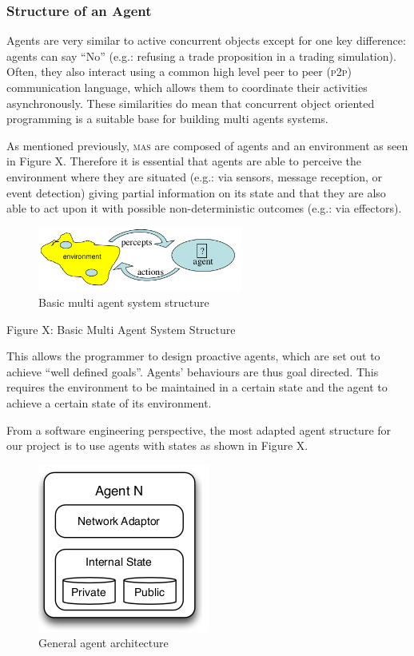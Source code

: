 \subsubsection{Structure of an Agent}

Agents are very similar to active concurrent objects except for one key difference: agents can say ``No'' (e.g.: refusing a trade proposition in a trading simulation). Often, they also interact using a common high level peer to peer (\textsc{p2p}) communication language, which allows them to coordinate their activities asynchronously. These similarities do mean that concurrent object oriented programming is a suitable base for building multi agents systems.

As mentioned previously, \textsc{mas} are composed of agents and an environment as seen in Figure X. Therefore it is essential that agents are able to perceive the environment where they are situated (e.g.: via sensors, message reception, or event detection) giving partial information on its state and that they are also able to act upon it with possible non-deterministic outcomes (e.g.: via effectors).

\begin{figure}[h!]
	\centering
	\includegraphics[width=0.6\textwidth]{img/mas.png}
	\caption{Basic multi agent system structure}
	\label{fig:mas}
\end{figure}

Figure X: Basic Multi Agent System Structure

This allows the programmer to design proactive agents, which are set out to achieve ``well defined goals''. Agents' behaviours are thus goal directed. This requires the environment to be maintained in a certain state and the agent to achieve a certain state of its environment.~\cite{MAS-DoC}

From a software engineering perspective, the most adapted agent structure for our project is to use agents with states as shown in Figure X.

\begin{figure}[h!]
	\centering
	\includegraphics[]{img/agent-architecture.png}
	\caption{General agent architecture~\cite{Sam-Transfer-Report}}
	\label{fig:agent-architecture}
\end{figure}


